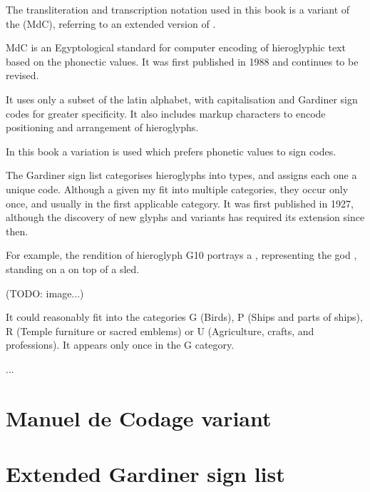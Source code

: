 The transliteration and transcription notation used in this book is a variant of the \textit{} (MdC), referring to an extended version of \textit{}.

MdC is an Egyptological standard for computer encoding of hieroglyphic text based on the phonectic values. It was first published in 1988 and continues to be revised.

It uses only a subset of the latin alphabet, with capitalisation and Gardiner sign codes for greater specificity. It also includes markup characters to encode positioning and arrangement of hieroglyphs.

In this book a variation is used which prefers phonetic values to sign codes.

The Gardiner sign list categorises hieroglyphs into types, and assigns each one a unique code. Although a given  my fit into multiple categories, they occur only once, and usually in the first applicable category. It was first published in 1927, although the discovery of new glyphs and variants has required its extension since then.

For example, the rendition of hieroglyph G10 portrays a , representing the god , standing on a  on top of a sled.

(TODO: image...)

It could reasonably fit into the categories G (Birds), P (Ships and parts of ships), R (Temple furniture or sacred emblems) or U (Agriculture, crafts, and professions). It appears only once in the G category.

...

\section*{Manuel de Codage variant}

\section*{Extended Gardiner sign list}
